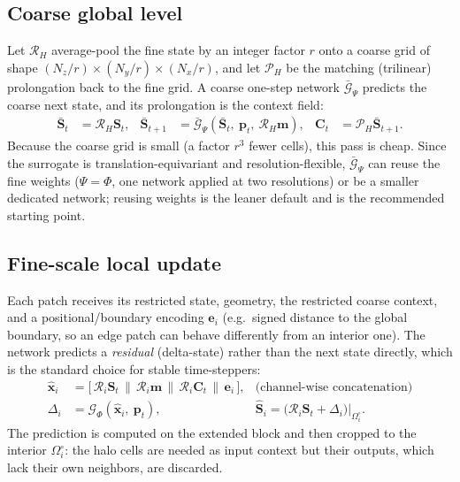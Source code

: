 \documentclass[11pt]{article}
\newcommand{\Rop}{\mathcal{R}}
\newcommand{\Gfine}{\mathcal{G}_{\Phi}}
\newcommand{\Gcoarse}{\bar{\mathcal{G}}_{\Psi}}
\begin{document}
\subsection{Coarse global level}
Let $\Rop_H$ average-pool the fine state by an integer factor $r$ onto a coarse
grid of shape $(N_z/r)\times(N_y/r)\times(N_x/r)$, and let $\mathcal P_H$ be the
matching (trilinear) prolongation back to the fine grid. A coarse one-step
network $\Gcoarse$ predicts the coarse next state, and its prolongation is the
context field:
\begin{align}
\bar{\bm S}_t &= \Rop_H \bm S_t, &
\bar{\bm S}_{t+1} &= \Gcoarse\!\left(\bar{\bm S}_t,\ \bm p_t,\ \Rop_H \bm m\right), &
\bm C_t &= \mathcal P_H \bar{\bm S}_{t+1}.
\label{eq:coarse}
\end{align}
Because the coarse grid is small (a factor $r^3$ fewer cells), this pass is
cheap. Since the surrogate is translation-equivariant and resolution-flexible,
$\Gcoarse$ can reuse the fine weights ($\Psi=\Phi$, one network applied at two
resolutions) or be a smaller dedicated network; reusing weights is the leaner
default and is the recommended starting point.

\subsection{Fine-scale local update}
Each patch receives its restricted state, geometry, the restricted coarse
context, and a positional/boundary encoding $\bm e_i$ (e.g.\ signed distance to
the global boundary, so an edge patch can behave differently from an interior
one). The network predicts a \emph{residual} (delta-state) rather than the next
state directly, which is the standard choice for stable time-steppers:
\begin{align}
\hat{\bm x}_i &= \big[\, \Rop_i \bm S_t \,\|\, \Rop_i \bm m \,\|\, \Rop_i \bm C_t \,\|\, \bm e_i \,\big],
& \text{(channel-wise concatenation)} \\
\Delta_i &= \Gfine(\hat{\bm x}_i,\ \bm p_t),
& \hat{\bm S}_i = \big(\Rop_i \bm S_t + \Delta_i\big)\big|_{\Omega_i^\circ}.
\label{eq:fine}
\end{align}
The prediction is computed on the extended block and then cropped to the interior
$\Omega_i^\circ$: the halo cells are needed as input context but their outputs,
which lack their own neighbors, are discarded.
\end{document}
